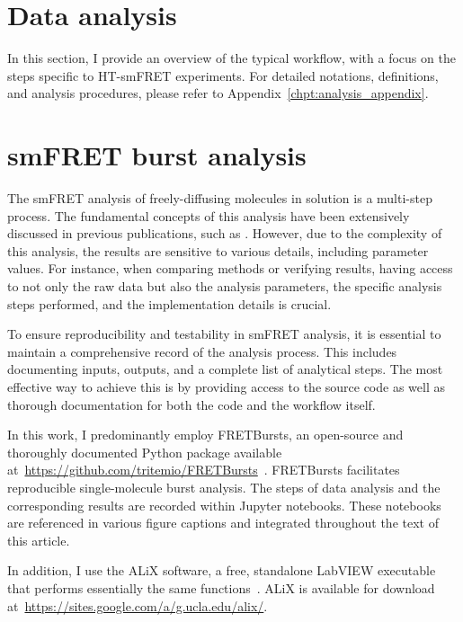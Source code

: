 \section{Data analysis}
\label{sec:analysis}

In this section, I provide an overview of the typical workflow, with a focus on the steps specific to \ac{HT-smFRET} experiments. 
For detailed notations, definitions, and analysis procedures, please refer to Appendix~\ref{chpt:analysis_appendix}.

\section{smFRET burst analysis}
\label{sec:FRETBursts_analysis}

The \ac{smFRET} analysis of freely-diffusing molecules in solution is a multi-step process. 
The fundamental concepts of this analysis have been extensively discussed in previous publications, such as \cite{fries_JPCA_1998, ying_JPCB_2000, eggeling_JB_2001, lee_BPJ_2005, nir_JPCB_2006, sisamakis_MIE_2010, kudryavtsev_CPC_2012, ingargiola_PLOS1_2016}. 
However, due to the complexity of this analysis, the results are sensitive to various details, including parameter values.
For instance, when comparing methods or verifying results, having access to not only the raw data but also the analysis parameters, the specific analysis steps performed, and the implementation details is crucial.

To ensure reproducibility and testability in \ac{smFRET} analysis, it is essential to maintain a comprehensive record of the analysis process.
This includes documenting inputs, outputs, and a complete list of analytical steps. 
The most effective way to achieve this is by providing access to the source code as well as thorough documentation for both the code and the workflow itself.

In this work, I predominantly employ FRETBursts, an open-source and thoroughly documented Python package available at~\href{https://github.com/tritemio/FRETBursts}{https://github.com/tritemio/FRETBursts}~\cite{ingargiola_PLOS1_2016}. 
FRETBursts facilitates reproducible single-molecule burst analysis. The steps of data analysis and the corresponding results are recorded within Jupyter notebooks. 
These notebooks are referenced in various figure captions and integrated throughout the text of this article.

In addition, I use the ALiX software, a free, standalone LabVIEW executable that performs essentially the same functions~\cite{ingargiola_PLOS1_2016}. 
ALiX is available for download at~\href{https://sites.google.com/a/g.ucla.edu/alix/}{https://sites.google.com/a/g.ucla.edu/alix/}.

